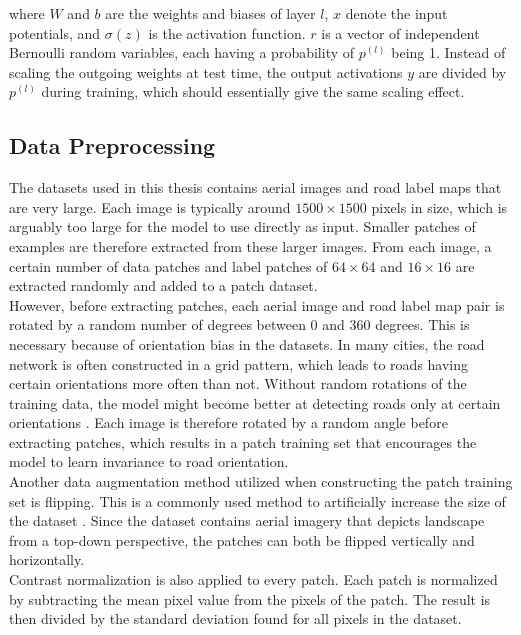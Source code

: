 \noindent where $W$ and $b$ are the weights and biases of layer $l$, $x$ denote the input potentials, and $\sigma(z)$ is the activation function. $r$ is a vector of independent Bernoulli random variables, each having a probability of $p^{(l)}$ being 1. Instead of scaling the outgoing weights at test time, the output activations $y$ are divided by $p^{(l)}$  during training, which should essentially give the same scaling effect.\\


\subsection{Data Preprocessing}
The datasets used in this thesis contains aerial images and road label maps that are very large. Each image is typically around $1500 \times 1500$ pixels in size, which is arguably too large for the model to use directly as input. Smaller patches of examples are therefore extracted from these larger images. From each image, a certain number of data patches and label patches of $64 \times 64$ and $16 \times 16$ are extracted randomly and added to a patch dataset.\\

However, before extracting patches, each aerial image and road label map pair is rotated by a random number of degrees between 0 and 360 degrees. This is necessary because of orientation bias in the datasets. In many cities, the road network is often constructed in a grid pattern, which leads to roads having certain orientations more often than not. Without random rotations of the training data, the model might become better at detecting roads only at certain orientations \citep{Mnih_roads_high_res_aerial_images}. Each image is therefore rotated by a random angle before extracting patches, which results in a patch training set that encourages the model to learn invariance to road orientation.\\

Another data augmentation method utilized when constructing the patch training set is flipping. This is a commonly used method to artificially increase the size of the dataset \citep{Krizhevsky_imagenet}. Since the dataset contains aerial imagery that depicts landscape from a top-down perspective, the patches can both be flipped vertically and horizontally.\\

Contrast normalization is also applied to every patch. Each patch is normalized by subtracting the mean pixel value from the pixels of the patch. The result is then divided by the standard deviation found for all pixels in the dataset.\\

